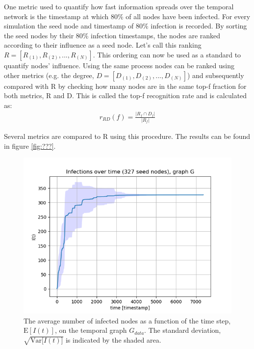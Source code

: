 \documentclass[letterpaper]{article}
\begin{document}
One metric used to quantify how fast information spreads over the temporal network is the timestamp at which 80\% of all nodes have been infected. For every simulation the seed node and timestamp of 80\% infection is recorded. By sorting the seed nodes by their 80\% infection timestamps, the nodes are ranked according to their influence as a seed node. Let's call this ranking \(R=[R_{(1)}, R_{(2)}, ..., R_{(N)}]\). This ordering can now be used as a standard to quantify nodes' influence. Using the same process nodes can be ranked using other metrics (e.g. the degree, \(D=[D_{(1)}, D_{(2)}, ..., D_{(N)}]\)) and subsequently compared with R by checking how many nodes are in the same top-f fraction for both metrics, R and D. This is called the top-f recognition rate and is calculated as:
\begin{align*}
	r_{RD}(f) = \frac{\left|R_f \cap D_f\right|}{\left|R_f\right|}
\end{align*}

Several metrics are compared to R using this procedure. The results can be found in figure \ref{fig:???}. 

\begin{figure}[ht!]
  \centering
   \includegraphics[width=\textwidth]{img/infections_G.png}
   \caption{The average number of infected nodes as a function of the time step, $\mathrm{E}[I(t)]$, 
 on the temporal graph $G_{data}$. The standard deviation, $\sqrt{\mathrm{Var}{[I(t)}]}$ is indicated by the shaded area.}
   \label{fig:infections_G}
\end{figure}
\end{document}
